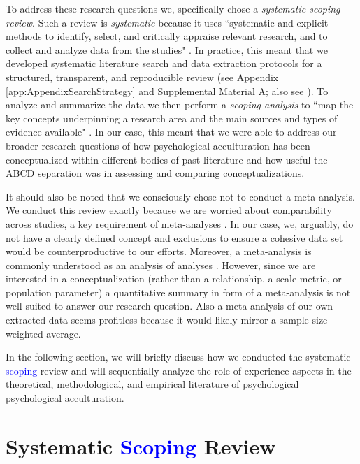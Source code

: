 \documentclass[man, 12pt, a4paper, mask]{apa7}
\begin{document}
To address these research questions we, specifically chose a \textit{systematic scoping review}. Such a review is \textit{systematic} because it uses ``systematic and explicit methods to identify, select, and critically appraise relevant research, and to collect and analyze data from the studies" \citep[PRISMA guidelines; ][p. 1]{Moher2009}. In practice, this meant that we developed systematic literature search and data extraction protocols for a structured, transparent, and reproducible review (see \hyperref[app:AppendixSearchStrategy]{Appendix \ref*{app:AppendixSearchStrategy}} and Supplemental Material A; also see \citealp{Peters2015}). To analyze and summarize the data we then perform a \textit{scoping analysis} to ``map the key concepts underpinning a research area and the main sources and types of evidence available" \citep[][p.21]{Arksey2005}. In our case, this meant that we were able to address our broader research questions of how psychological acculturation has been conceptualized within different bodies of past literature and how useful the ABCD separation was in assessing and comparing conceptualizations.

\color{black}
It should also be noted that we consciously chose not to conduct a meta-analysis. We conduct this review exactly because we are worried about comparability across studies, a key requirement of meta-analyses \citep{Pogue1998}. In our case, we, arguably, do not have a clearly defined concept and exclusions to ensure a cohesive data set would be counterproductive to our efforts. Moreover, a meta-analysis is commonly understood as an analysis of analyses \citep{Glass1976}. However, since we are interested in a conceptualization (rather than a relationship, a scale metric, or population parameter) a quantitative summary in form of a meta-analysis is not well-suited to answer our research question. Also a meta-analysis of our own extracted data seems profitless because it would likely mirror a sample size weighted average.

In the following section, we will briefly discuss how we conducted the systematic \textcolor{blue}{scoping} review and will sequentially analyze the role of experience aspects in the theoretical, methodological, and empirical literature of psychological psychological acculturation.




\section{Systematic \textcolor{blue}{Scoping} Review}

\end{document}
